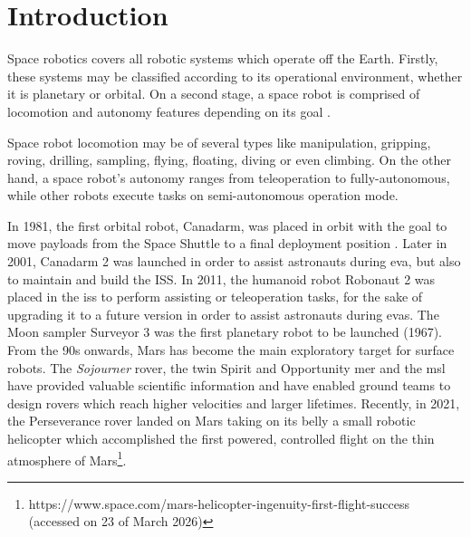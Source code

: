 

\chapter{Introduction}
\label{chapter:introduction}

Space robotics covers all robotic systems which operate off the Earth. Firstly, these systems may be  classified according to its operational environment, whether it is planetary or orbital. On a second stage, a space robot is comprised of locomotion and autonomy features depending on its goal \cite{Gao2017}.

Space robot locomotion may be of several types like manipulation, gripping, roving, drilling, sampling, flying, floating, diving or even climbing. On the other hand, a space robot's autonomy ranges from teleoperation to fully-autonomous, while other robots execute tasks on semi-autonomous operation mode.

In 1981, the first orbital robot, Canadarm, was placed in orbit with the goal to move payloads from the Space Shuttle to a final deployment position \cite{roboticsHandbook_chap55}. Later in 2001, Canadarm 2 was launched in order to assist astronauts during \acrshort{eva}, but also to maintain and build the ISS. In 2011, the humanoid robot Robonaut 2 was placed in the \acrshort{iss} to perform assisting or teleoperation tasks, for the sake of upgrading it to a future version in order to assist astronauts during \acrshort{eva}s. The Moon sampler Surveyor 3 was the first planetary robot to be launched (1967). From the 90s onwards, Mars has become the main exploratory target for surface robots. The \textit{Sojourner} rover, the twin Spirit and Opportunity \acrshort{mer} and the \acrshort{msl} have provided valuable scientific information and have enabled ground teams to design rovers which reach higher velocities and larger lifetimes. Recently, in 2021, the Perseverance rover landed on Mars taking on its belly a small robotic helicopter which accomplished the first powered, controlled flight on the thin atmosphere of Mars\footnote{https://www.space.com/mars-helicopter-ingenuity-first-flight-success (accessed on 23 of March 2026)}.

